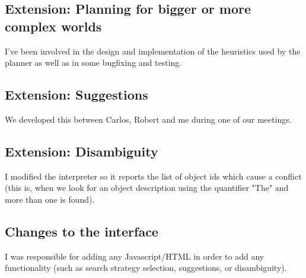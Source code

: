 \documentclass[11pt]{article}
\begin{document}
\subsection{Extension: Planning for bigger or more complex worlds}

I've been involved in the design and implementation of the heuristics used by the planner as well as in some 
bugfixing and testing.

\subsection{Extension: Suggestions}

We developed this between Carlos, Robert and me during one of our meetings.

\subsection{Extension: Disambiguity}

I modified the interpreter so it reports the list of object ids which cause a conflict (this is, 
when we look for an object description using the quantifier "The" and more than one is found).

\subsection{Changes to the interface}

I was responsible for adding any Javascript/HTML in order to add any functionality (such as search strategy selection, suggestions, or disambiguity). 
\end{document}
